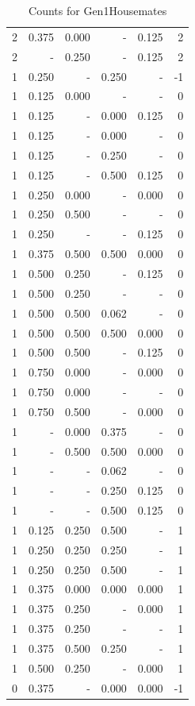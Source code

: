 \documentclass[a4paper]{article}\usepackage{graphicx, color}
\begin{document}
\begin{table}[ht]
\begin{tabular}{rrrrrr}
  2 & 0.375 & 0.000 & - & 0.125 & 2 \\ 
  2 & - & 0.250 & - & 0.125 & 2 \\ 
   \rowcolor{sosoColor} 1 & 0.250 & - & 0.250 & - & -1 \\ 
  1 & 0.125 & 0.000 & - & - & 0 \\ 
   \rowcolor{sosoColor} 1 & 0.125 & - & 0.000 & 0.125 & 0 \\ 
   \rowcolor{sosoColor} 1 & 0.125 & - & 0.000 & - & 0 \\ 
   \rowcolor{sosoColor} 1 & 0.125 & - & 0.250 & - & 0 \\ 
   \rowcolor{sosoColor} 1 & 0.125 & - & 0.500 & 0.125 & 0 \\ 
  1 & 0.250 & 0.000 & - & 0.000 & 0 \\ 
  1 & 0.250 & 0.500 & - & - & 0 \\ 
   \rowcolor{nullColor} 1 & 0.250 & - & - & 0.125 & 0 \\ 
   \rowcolor{goodColor} 1 & 0.375 & 0.500 & 0.500 & 0.000 & 0 \\ 
  1 & 0.500 & 0.250 & - & 0.125 & 0 \\ 
  1 & 0.500 & 0.250 & - & - & 0 \\ 
   \rowcolor{badColor} 1 & 0.500 & 0.500 & 0.062 & - & 0 \\ 
   \rowcolor{goodColor} 1 & 0.500 & 0.500 & 0.500 & 0.000 & 0 \\ 
  1 & 0.500 & 0.500 & - & 0.125 & 0 \\ 
  1 & 0.750 & 0.000 & - & 0.000 & 0 \\ 
  1 & 0.750 & 0.000 & - & - & 0 \\ 
  1 & 0.750 & 0.500 & - & 0.000 & 0 \\ 
   \rowcolor{badColor} 1 & - & 0.000 & 0.375 & - & 0 \\ 
   \rowcolor{goodColor} 1 & - & 0.500 & 0.500 & 0.000 & 0 \\ 
   \rowcolor{sosoColor} 1 & - & - & 0.062 & - & 0 \\ 
   \rowcolor{sosoColor} 1 & - & - & 0.250 & 0.125 & 0 \\ 
   \rowcolor{sosoColor} 1 & - & - & 0.500 & 0.125 & 0 \\ 
   \rowcolor{badColor} 1 & 0.125 & 0.250 & 0.500 & - & 1 \\ 
   \rowcolor{goodColor} 1 & 0.250 & 0.250 & 0.250 & - & 1 \\ 
   \rowcolor{badColor} 1 & 0.250 & 0.250 & 0.500 & - & 1 \\ 
   \rowcolor{goodColor} 1 & 0.375 & 0.000 & 0.000 & 0.000 & 1 \\ 
  1 & 0.375 & 0.250 & - & 0.000 & 1 \\ 
  1 & 0.375 & 0.250 & - & - & 1 \\ 
   \rowcolor{badColor} 1 & 0.375 & 0.500 & 0.250 & - & 1 \\ 
  1 & 0.500 & 0.250 & - & 0.000 & 1 \\ 
   \rowcolor{sosoColor} 0 & 0.375 & - & 0.000 & 0.000 & -1 \\ 
   \hline
\end{tabular}
\caption{Counts for Gen1Housemates} 
\end{table}
\end{document}

